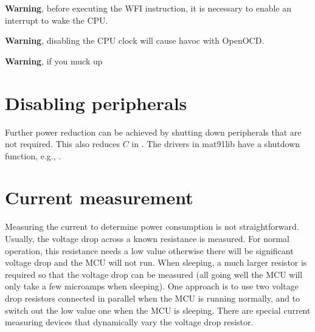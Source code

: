 \textbf{Warning}, before executing the WFI instruction, it is necessary
to enable an interrupt to wake the CPU.

\textbf{Warning}, disabling the CPU clock will cause havoc with
OpenOCD.

\textbf{Warning}, if you muck up


\section{Disabling peripherals}

Further power reduction can be achieved by shutting down peripherals
that are not required.  This also reduces $C$ in .  The
drivers in mat91lib have a shutdown function, e.g., .



\section{Current measurement}

Measuring the current to determine power consumption is not
straightforward.  Usually, the voltage drop across a known resistance
is measured.  For normal operation, this resistance needs a low value
otherwise there will be significant voltage drop and the MCU will not
run.  When sleeping, a much larger resistor is required so that the
voltage drop can be measured (all going well the MCU will only take a
few microamps when sleeping).  One approach is to use two voltage drop
resistors connected in parallel when the MCU is running normally, and
to switch out the low value one when the MCU is sleeping.  There are
special current measuring devices that dynamically vary the voltage
drop resistor.




